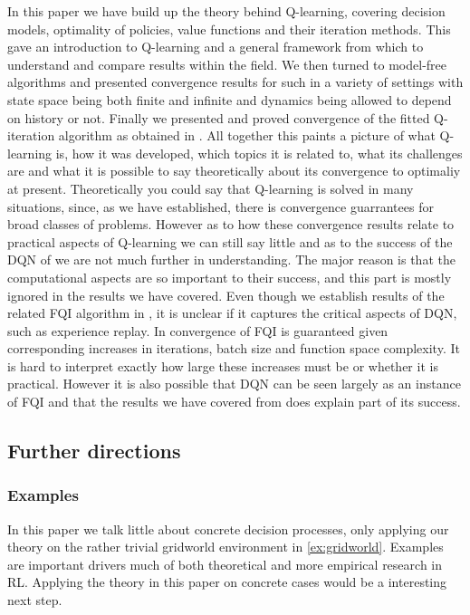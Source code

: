 

In this paper we have build up the theory behind Q-learning,
covering decision models, optimality of policies,
value functions and their iteration methods.
This gave an introduction to Q-learning 
and a general framework from which to understand
and compare results within the field.
We then turned to model-free algorithms 
and presented convergence results for such in a variety
of settings with state space being both finite and infinite and
dynamics being allowed to depend on history or not.
Finally we presented and proved convergence of the fitted Q-iteration
algorithm as obtained in .
All together this paints a picture of what Q-learning is,
how it was developed, which topics it is related to,
what its challenges are and what it is possible to
say theoretically about its convergence to optimaliy at present.
Theoretically you could say that Q-learning is solved in many situations,
since, as we have established,
there is convergence guarrantees for broad classes of problems.
However as to how these convergence results relate to practical aspects of
Q-learning we can still say little and as to the success of the DQN of
 we are not much further in understanding.
The major reason is that the computational aspects are so important to their 
success, and this part is mostly ignored in the results we have covered.
Even though we establish results of the related FQI algorithm in ,
it is unclear if it captures the critical aspects of DQN,
such as experience replay.
In  convergence of FQI is guaranteed given corresponding
increases in iterations, batch size and function space complexity.
It is hard to interpret exactly how large these increases must be
or whether it is practical.
However it is also possible that DQN can be seen largely as an instance of FQI 
and that the results we have covered from  does explain
part of its success.

\subsection{Further directions}
\subsubsection{Examples}
In this paper we talk little about concrete decision processes, only
applying our theory on the rather trivial gridworld environment in
\cref{ex:gridworld}.
Examples are important drivers much of both theoretical and more empirical
research in RL.
Applying the theory in this paper on concrete cases would be a interesting
next step.

